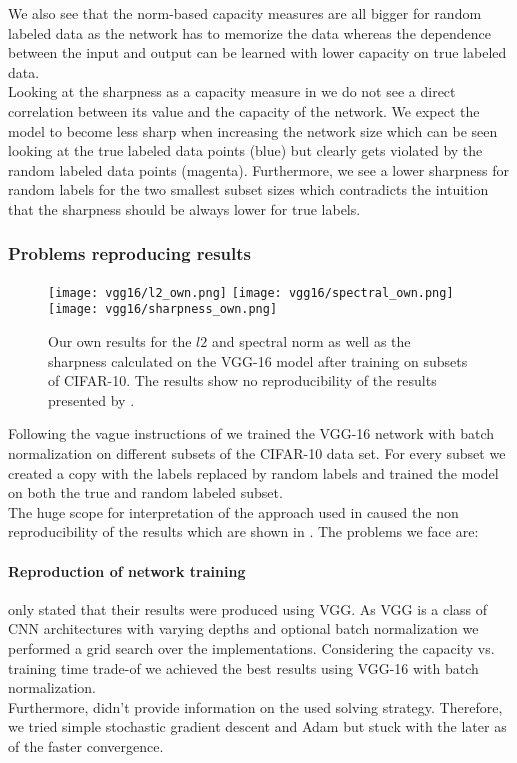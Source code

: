We also see that the norm-based capacity measures are all bigger for random labeled data as the network has to memorize the data whereas the dependence between the input and output can be learned with lower capacity on true labeled data. \\
%
Looking at the sharpness as a capacity measure in  we do not see a direct correlation between its value and the capacity of the network. We expect the model to become less sharp when increasing the network size which can be seen looking at the true labeled data points (blue) but clearly gets violated by the random labeled data points (magenta). Furthermore, we see a lower sharpness for random labels for the two smallest subset sizes which contradicts the intuition that the sharpness should be always lower for true labels. 
%
\subsubsection{Problems reproducing results}
\label{sec:problems-subset-sizes}
\begin{figure}[ht]
	\centering
	\texttt{[image: vgg16/l2\_own.png]}
	\texttt{[image: vgg16/spectral\_own.png]}
	\texttt{[image: vgg16/sharpness\_own.png]}
	\caption{Our own results for the $l2$ and spectral norm as well as the sharpness calculated on the VGG-16 model after training on subsets of CIFAR-10. The results show no reproducibility of the results presented by \cite{neyshabur2017exploring}.}	
	\label{fig:norms-own}
\end{figure}
Following the vague instructions of \cite{neyshabur2017exploring} we trained the VGG-16 network with batch normalization  on different subsets of the CIFAR-10  data set. For every subset we created a copy with the labels replaced by random labels and trained the model on both the true and random labeled subset. \\
%
The huge scope for interpretation of the approach used in \cite{neyshabur2017exploring} caused the non reproducibility of the results which are shown in . The problems we face are:
%
\paragraph{Reproduction of network training}
\label{sec:problems-reproduction-training}
\ns{} only stated that their results were produced using VGG. As VGG is a class of CNN architectures with varying depths and optional batch normalization we performed a grid search over the implementations. Considering the capacity vs. training time trade-of we achieved the best results using VGG-16 with batch normalization.\\
Furthermore, \cite{neyshabur2017exploring} didn't provide information on the used solving strategy. Therefore, we tried simple stochastic gradient descent and Adam but stuck with the later as of the faster convergence.
%
